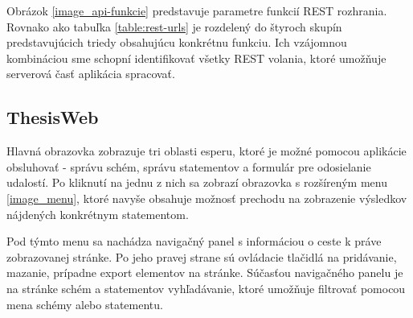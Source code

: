 	Obrázok \ref{image_api-funkcie} predstavuje parametre funkcií REST rozhrania. Rovnako ako tabuľka \ref{table:rest-urls} je rozdelený do štyroch skupín predstavujúcich triedy obsahujúcu konkrétnu funkciu. Ich vzájomnou kombináciou sme schopní identifikovať všetky REST volania, ktoré umožňuje serverová časť aplikácia spracovať.



	\subsection{ThesisWeb}
	Hlavná obrazovka zobrazuje tri oblasti esperu, ktoré je možné pomocou aplikácie obsluhovať - správu schém, správu statementov a formulár pre odosielanie udalostí. Po kliknutí na jednu z nich sa zobrazí obrazovka s rozšíreným menu \ref{image_menu}, ktoré navyše obsahuje možnosť prechodu na zobrazenie výsledkov nájdených konkrétnym statementom.
	
	Pod týmto menu sa nachádza navigačný panel s informáciou o ceste k práve zobrazovanej stránke. Po jeho pravej strane sú ovládacie tlačidlá na pridávanie, mazanie, prípadne export elementov na stránke. Súčasťou navigačného panelu je na stránke schém a statementov vyhľadávanie, ktoré umožňuje filtrovať pomocou mena schémy alebo statementu.
	
